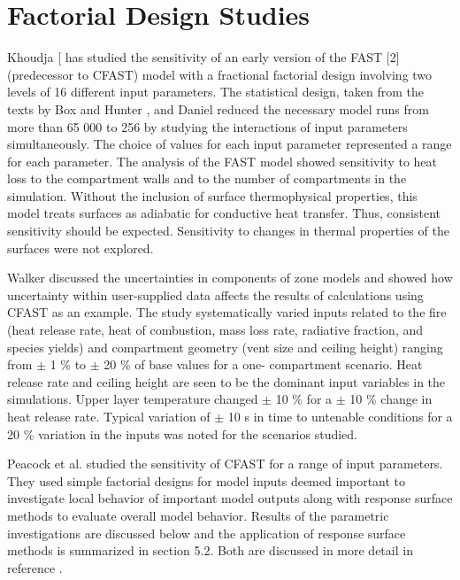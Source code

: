 \section{Factorial Design Studies}

Khoudja [\cite{Khoudja:1988} has studied the sensitivity of an early version of the FAST [2] (predecessor to CFAST) model with a fractional factorial design involving two levels of 16 different input 
parameters. The statistical design, taken from the texts by Box and Hunter \cite{Box:1978}, and Daniel \cite{Daniel:1976} reduced the necessary model runs from more than 65 000 to 256 by studying the interactions of input parameters simultaneously. The choice of values for each input parameter represented a range for each parameter. The analysis of the FAST model showed sensitivity to heat loss to the compartment walls and to the number of compartments in the simulation. Without the inclusion 
of surface thermophysical properties, this model treats surfaces as adiabatic for conductive heat 
transfer. Thus, consistent sensitivity should be expected. Sensitivity to changes in thermal 
properties of the surfaces were not explored. 

Walker \cite{Walker:1997} discussed the uncertainties in components of zone models and showed how 
uncertainty within user-supplied data affects the results of calculations using CFAST as an 
example. The study systematically varied inputs related to the fire (heat release rate, heat of 
combustion, mass loss rate, radiative fraction, and species yields) and compartment geometry 
(vent size and ceiling height) ranging from  $\pm$ 1 \% to $\pm$ 20 \% of base values for a one- 
compartment scenario. Heat release rate and ceiling height are seen to be the dominant input 
variables in the simulations. Upper layer temperature changed $\pm$ 10 \% for a $\pm$ 10 \% change in 
heat release rate. Typical variation of $\pm$ 10 s in time to untenable conditions for a 20 \% variation 
in the inputs was noted for the scenarios studied. 

Peacock et al. \cite{Peacock:1988a} studied the sensitivity of CFAST for a range of input parameters. They used simple factorial designs for model inputs deemed important to investigate local behavior of 
important model outputs along with response surface methods to evaluate overall model 
behavior. Results of the parametric investigations are discussed below and the application of 
response surface methods is summarized in section 5.2. Both are discussed in more detail in 
reference \cite{Peacock:1988a}.

